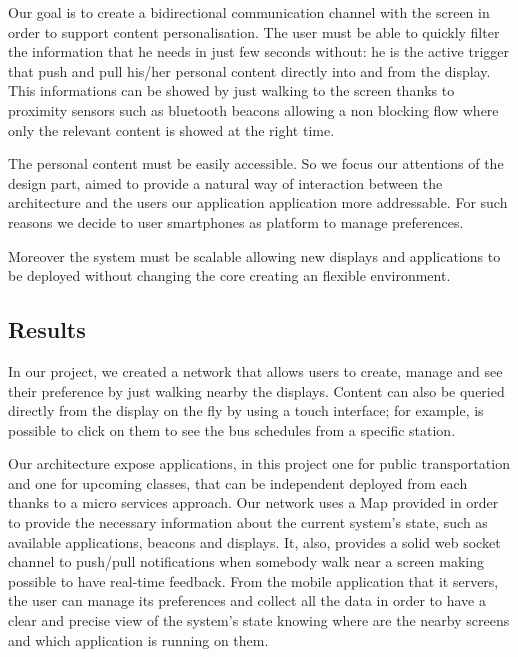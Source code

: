 \documentclass[]{usiinfbachelorproject}
\begin{document}
Our goal is to create a bidirectional communication channel with the screen in order to support content personalisation. The user must be able to quickly filter the information that he needs in just few seconds without: he is the active trigger that push and pull his/her personal content directly into and from the display. This informations can be showed by just walking to the screen thanks to proximity sensors such as bluetooth beacons allowing a non blocking flow where only the relevant content is showed at the right time. 

The personal content must be easily accessible. So we focus our attentions of the design part, aimed to provide a natural way of interaction between the architecture and the users our application application more addressable. For such reasons we decide to user smartphones as platform to manage preferences.

Moreover the system must be scalable allowing new displays and applications to be deployed without changing the core creating an flexible environment.

\subsection{Results}
In our project, we created a network that allows users to create, manage and see their preference by just walking nearby the displays. Content can also be queried directly from the display on the fly by using a touch interface; for example, is possible to click on them to see the bus schedules from a specific station.

Our architecture expose applications, in this project one for public transportation and one for upcoming classes, that can be independent deployed from each thanks to a micro services approach. Our network uses a Map provided in order to provide the necessary information about the current system's state, such as available applications, beacons and displays. It, also, provides a solid web socket channel to push/pull notifications when somebody walk near a screen making possible to have real-time feedback. From the mobile application that it servers, the user can manage its preferences and collect all the data in order to have a clear and precise view of the system's state knowing where are the nearby screens and which application is running on them.
\end{document}
